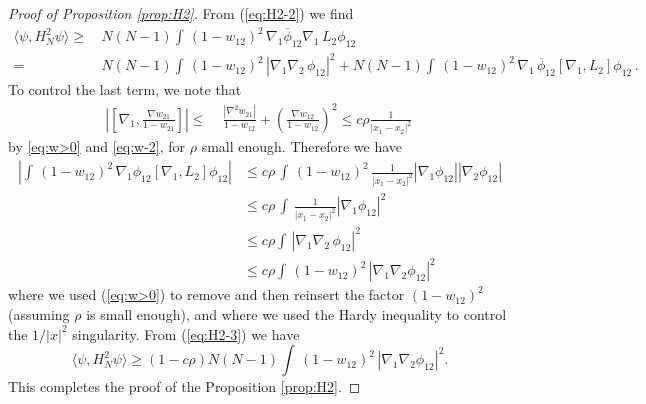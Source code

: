 \documentclass[11pt]{article}
\begin{document}
\begin{proof}[Proof of Proposition \ref{prop:H2}]
{F}rom (\ref{eq:H2-2}) we find
\begin{equation}\label{eq:H2-3}
\begin{split}
\langle \psi, H_N^2 \psi \rangle \geq \, &N (N-1) \int \,
(1-w_{12})^2 \, \nabla_1 \overline{\phi}_{12} \nabla_1 \, L_2
\phi_{12} \\ = \, &N(N-1) \int \, (1-w_{12})^2 \, |\nabla_1 \nabla_2
\, \phi_{12}|^2 + N (N-1) \int \, (1- w_{12})^2 \, \nabla_1 \,
\overline{\phi}_{12} [\nabla_1, L_2] \phi_{12} \, .
\end{split}
\end{equation}
To control the last term, we note that
\begin{equation*}
\begin{split}\left| \left[
\nabla_1, \frac{\nabla w_{21}}{1-w_{21}} \right] \right| \leq \;
&\frac{\left|\nabla^2 w_{21}\right|}{1-w_{12}} + \left(\frac{\nabla
w_{12}}{1-w_{12}} \right)^2  \leq  c \rho \frac{1}{|x_1 - x_2|^2}\,
\end{split}
\end{equation*}
by \eqref{eq:w>0} and \eqref{eq:w-2}, for $\rho$ small enough.
Therefore we have
\begin{equation}\label{eq:H2-3b}
\begin{split}
\left|\int \, (1- w_{12})^2 \, \nabla_1 \phi_{12} [\nabla_1, L_2]
\phi_{12} \right| &\leq c \rho \, \int  \, (1-w_{12})^2 \,
\frac{1}{|x_1 - x_2|^2} |\nabla_1 \phi_{12}| |\nabla_2 \phi_{12}|
\\ & \leq c \rho  \, \int  \, \frac{1}{|x_1 -
x_2|^2} |\nabla_1 \phi_{12}|^2
\\ &\leq c \rho \int \, |\nabla_1 \nabla_2 \, \phi_{12}|^2
\\ &\leq c \rho \int \, (1- w_{12})^2 \, |\nabla_1 \nabla_2 \phi_{12}|^2
\end{split}
\end{equation}
where we used (\ref{eq:w>0}) to remove and then reinsert the factor
$(1-w_{12})^2$ (assuming $\rho$ is small enough), and where we used
the Hardy inequality to control the $1/|x|^2$ singularity. {F}rom
(\ref{eq:H2-3}) we have
\begin{equation}
\langle \psi, H_N^2 \psi \rangle \geq (1-c\rho) N (N-1) \int \,
(1-w_{12})^2 \, |\nabla_1 \nabla_2 \phi_{12}|^2.
\end{equation}
This completes the proof of the Proposition \ref{prop:H2}.
\end{proof}
\end{document}
